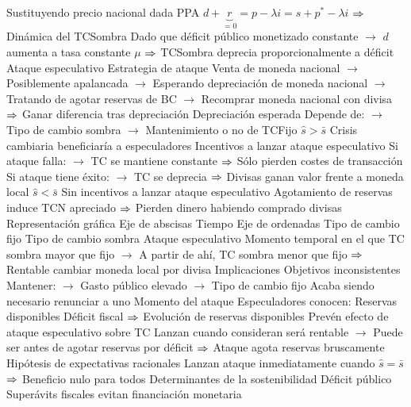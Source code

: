 \documentclass{nuevotema}
\begin{document}
\begin{esquemal}
				\4 Sustituyendo precio nacional dada PPA
				\4[] $d + \underbrace{r}_{=0} = p - \lambda i = s + p^* - \lambda i$
				\4[] $\Rightarrow$ 
				\4 Dinámica del TCSombra
				\4[] Dado que déficit público monetizado constante
				\4[] $\to$ $d$ aumenta a tasa constante $\mu$
				\4[] $\Rightarrow$ TCSombra deprecia proporcionalmente a déficit
			\3 Ataque especulativo
				\4 Estrategia de ataque
				\4[] Venta de moneda nacional
				\4[] $\to$ Posiblemente apalancada
				\4[] $\to$ Esperando depreciación de moneda nacional
				\4[] $\to$ Tratando de agotar reservas de BC
				\4[] $\to$ Recomprar moneda nacional con divisa
				\4[] $\Rightarrow$ Ganar diferencia tras depreciación
				\4 Depreciación esperada
				\4[] Depende de:
				\4[] $\to$ Tipo de cambio sombra
				\4[] $\to$ Mantenimiento o no de TCFijo
				\4 $\hat{s} > \bar{s}$
				\4[] Crisis cambiaria beneficiaría a especuladores
				\4[] Incentivos a lanzar ataque especulativo
				\4[] Si ataque falla:
				\4[] $\to$ TC se mantiene constante
				\4[] $\Rightarrow$ Sólo pierden costes de transacción
				\4[] Si ataque tiene éxito:
				\4[] $\to$ TC se deprecia
				\4[] $\Rightarrow$ Divisas ganan valor frente a moneda local
				\4 $\hat{s} < \bar{s}$
				\4[] Sin incentivos a lanzar ataque especulativo
				\4[] Agotamiento de reservas induce TCN apreciado
				\4[] $\Rightarrow$ Pierden dinero habiendo comprado divisas
			\3 Representación gráfica
				\4 Eje de abscisas
				\4[] Tiempo
				\4 Eje de ordenadas
				\4[] Tipo de cambio fijo
				\4[] Tipo de cambio sombra
				\4 Ataque especulativo
				\4[] Momento temporal en el que TC sombra mayor que fijo
				\4[] $\to$ A partir de ahí, TC sombra menor que fijo
				\4[] $\Rightarrow$ Rentable cambiar moneda local por divisa
				\4 
		\2 Implicaciones
			\3 Objetivos inconsistentes
				\4 Mantener:
				\4[] $\to$ Gasto público elevado
				\4[] $\to$ Tipo de cambio fijo
				\4 Acaba siendo necesario renunciar a uno
			\3 Momento del ataque
				\4 Especuladores conocen:
				\4[] Reservas disponibles
				\4[] Déficit fiscal
				\4[] $\Rightarrow$ Evolución de reservas disponibles
				\4 Prevén efecto de ataque especulativo sobre TC
				\4[] Lanzan cuando consideran será rentable
				\4[] $\to$ Puede ser antes de agotar reservas por déficit
				\4[] $\Rightarrow$ Ataque agota reservas bruscamente
				\4 Hipótesis de expectativas racionales
				\4[] Lanzan ataque inmediatamente cuando $\hat{s}=\bar{s}$
				\4[] $\Rightarrow$ Beneficio nulo para todos
			\3 Determinantes de la sostenibilidad
				\4 Déficit público
				\4[] Superávits fiscales evitan financiación monetaria

\end{esquemal}
\end{document}
